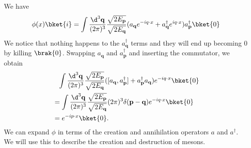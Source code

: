 \documentclass[a4paper]{article}
\begin{document}
We have
\[
  \phi(x) \bket{i} = \int \frac{\d^3 \mathbf{q}}{(2\pi)^3} \frac{\sqrt{2 E_\mathbf{p}}}{\sqrt{2 E_\mathbf{q}}} (a_\mathbf{q} e^{-iq\cdot x} + a_\mathbf{q}^\dagger e^{iq\cdot x}) a_\mathbf{p}^\dagger \bket{0}\\
\]
We notice that nothing happens to the $a_\mathbf{q}^\dagger$ terms and they will end up becoming $0$ by killing $\brak{0}$. Swapping $a_\mathbf{q}$ and $a_\mathbf{p}^\dagger$ and inserting the commutator, we obtain
\begin{align*}
  &\hphantom{=}\int \frac{\d^3 \mathbf{q}}{(2\pi)^3} \frac{\sqrt{2 E_\mathbf{p}}}{\sqrt{2 E_\mathbf{q}}} ([a_\mathbf{q}, a_\mathbf{p}^\dagger] + a_\mathbf{p}^\dagger a_\mathbf{q}) e^{-iq\cdot x} \bket{0}\\
  &= \int \frac{\d^3 \mathbf{q}}{(2\pi)^3} \frac{\sqrt{2 E_{\mathbf{p}}}}{\sqrt{2 E_\mathbf{q}}} (2\pi)^3 \delta(\mathbf{p} - \mathbf{q}) e^{-iq\cdot x} \bket{0}\\
  &= e^{-ip\cdot x}\bket{0}.
\end{align*}
We can expand $\phi$ in terms of the creation and annihilation operators $a$ and $a^\dagger$. We will use this to describe the creation and destruction of mesons.
\end{document}
